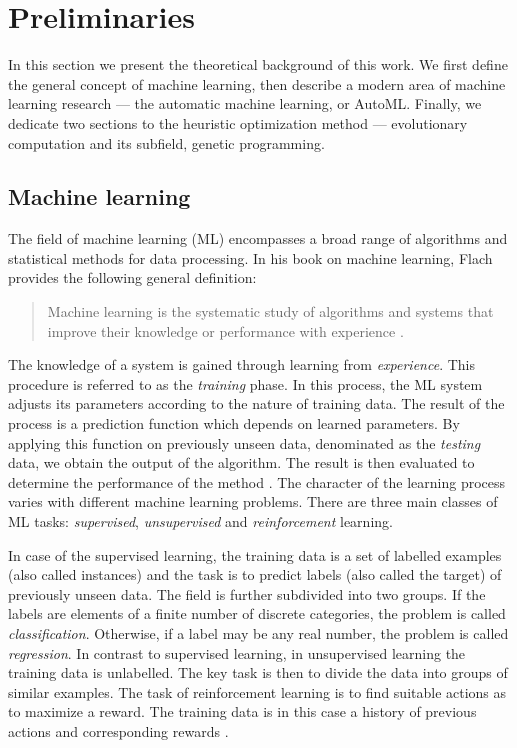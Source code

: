 \chapter{Preliminaries} \label{ch1:prelim}

In this section we present the theoretical background of this work. We first
define the general concept of machine learning, then describe a modern area
of machine learning research --- the automatic machine learning, or AutoML.
Finally, we dedicate two sections to the heuristic optimization method ---
evolutionary computation and its subfield, genetic programming.

\section{Machine learning} \label{sec:ml}
The field of machine learning (ML) encompasses a broad range of
algorithms and statistical methods for data processing. In his book on machine
learning, Flach provides the following general definition:

\blockquote{Machine learning is the systematic study of algorithms and systems
that improve their knowledge or performance with experience
\citep{Flach:2012:MLA:2490546}.}

The knowledge of a system is gained through learning from \emph{experience}.
This procedure is referred to as the \emph{training} phase. In this process, 
the ML system adjusts its parameters according to the nature of training data.
The result of the process is a prediction function which depends on learned
parameters. By applying this function on previously unseen data, denominated 
as the \emph{testing} data, we obtain the output of the algorithm. The 
result is then evaluated to determine the performance of the method 
\citep[p.~2]{Bishop:2006:PRM:1162264}. The character of the learning process
varies with different machine learning problems. There are three main classes 
of ML tasks: \emph{supervised}, \emph{unsupervised} and \emph{reinforcement} 
learning.

In case of the supervised learning, the training data is a set of labelled examples
(also called instances)
and the task is to predict labels (also called the target) of previously unseen data. The field is 
further subdivided into two groups. If the labels are elements of a finite 
number of discrete categories, the problem is called \emph{classification}. 
Otherwise, if a label may be any real number, the problem is called \emph{regression}.
In contrast to supervised learning, in unsupervised learning the training data 
is unlabelled. The key task is then to divide the data into groups of 
similar examples. The task of reinforcement learning is to find suitable
actions as to maximize a reward. The training data is in this case a history of
previous actions and corresponding rewards \citep[p.~3]{Bishop:2006:PRM:1162264}.

